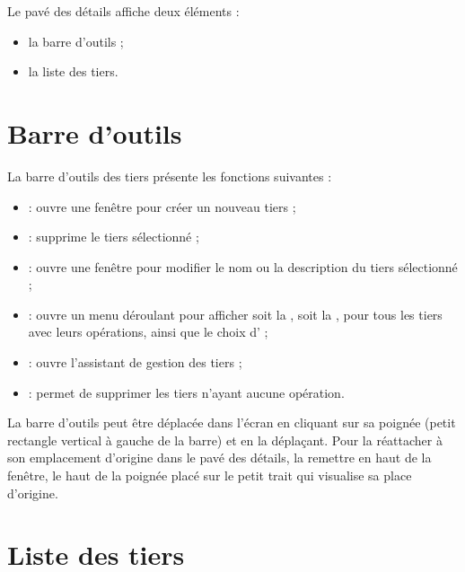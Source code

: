 Le pavé des détails affiche deux éléments :
\begin{itemize}
	 \item la barre d'outils ;
	 \item la liste des tiers.
\end{itemize}


\section{Barre d'outils\label{thirdparties-functions}}


La barre d'outils des tiers présente les fonctions suivantes  :

\begin{itemize}
	 \item {} : ouvre une fenêtre pour créer un nouveau tiers ;
	 \item {} : supprime le tiers sélectionné ;
	 \item {} : ouvre une fenêtre pour modifier le nom ou la description du tiers sélectionné ;
	 \item {} : ouvre un menu déroulant pour afficher soit la , soit la , pour tous les tiers avec leurs opérations, ainsi que le choix d' ;
	 \item {} : ouvre l'assistant de gestion des tiers ;
	 \item {} : permet de supprimer les tiers n'ayant aucune opération.
\end{itemize}

La barre d'outils peut être déplacée dans l'écran en cliquant sur sa poignée (petit rectangle vertical à gauche de la barre) et en la déplaçant. Pour la réattacher à son emplacement d'origine dans le pavé des détails, la remettre en haut de la fenêtre, le haut de la poignée placé sur le petit trait qui visualise sa place d'origine.


\section{Liste des tiers\label{thirdparties-list}}


